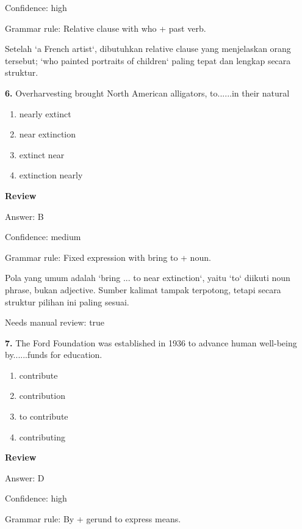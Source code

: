 \documentclass[12pt]{article}
\begin{document}
Confidence: high\par
Grammar rule: Relative clause with who + past verb.\par
Setelah `a French artist`, dibutuhkan relative clause yang menjelaskan orang tersebut; `who painted portraits of children` paling tepat dan lengkap secara struktur.\par
\endgroup
\par
\vspace{0.25\baselineskip}
\noindent\textbf{6.} Overharvesting brought North American alligators, to......in their natural
\begin{enumerate}[label=(\Alph*),leftmargin=*,itemsep=0.2em]
\item nearly extinct
\item near extinction
\item extinct near
\item extinction nearly
\end{enumerate}
\par
\begingroup
\setlength{\parskip}{0pt}
\setlength{\parindent}{0pt}
\textbf{Review}\par
Answer: B\par
Confidence: medium\par
Grammar rule: Fixed expression with bring to + noun.\par
Pola yang umum adalah `bring ... to near extinction`, yaitu `to` diikuti noun phrase, bukan adjective. Sumber kalimat tampak terpotong, tetapi secara struktur pilihan ini paling sesuai.\par
Needs manual review: true\par
\endgroup
\par
\vspace{0.25\baselineskip}
\noindent\textbf{7.} The Ford Foundation was established in 1936 to advance human well-being by......funds for education.
\begin{enumerate}[label=(\Alph*),leftmargin=*,itemsep=0.2em]
\item contribute
\item contribution
\item to contribute
\item contributing
\end{enumerate}
\par
\begingroup
\setlength{\parskip}{0pt}
\setlength{\parindent}{0pt}
\textbf{Review}\par
Answer: D\par
Confidence: high\par
Grammar rule: By + gerund to express means.\par
\end{document}
